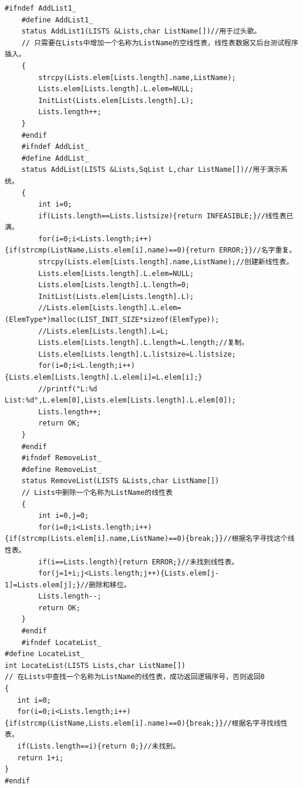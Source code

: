 \documentclass[supercite]{Experimental_Report}
\theoremstyle{definition}
\begin{document}
\begin{lstlisting}[title =多顺序表管理,frame=none]
	#ifndef AddList1_
	#define AddList1_
	status AddList1(LISTS &Lists,char ListName[])//用于过头歌。 
	// 只需要在Lists中增加一个名称为ListName的空线性表，线性表数据又后台测试程序插入。
	{
		strcpy(Lists.elem[Lists.length].name,ListName);
		Lists.elem[Lists.length].L.elem=NULL;
		InitList(Lists.elem[Lists.length].L);
		Lists.length++;
	}
	#endif
	#ifndef AddList_
	#define AddList_
	status AddList(LISTS &Lists,SqList L,char ListName[])//用于演示系统。 
	{
		int i=0;
		if(Lists.length==Lists.listsize){return INFEASIBLE;}//线性表已满。 
		for(i=0;i<Lists.length;i++){if(strcmp(ListName,Lists.elem[i].name)==0){return ERROR;}}//名字重复。 
		strcpy(Lists.elem[Lists.length].name,ListName);//创建新线性表。 
		Lists.elem[Lists.length].L.elem=NULL;
		Lists.elem[Lists.length].L.length=0;
		InitList(Lists.elem[Lists.length].L);
		//Lists.elem[Lists.length].L.elem=(ElemType*)malloc(LIST_INIT_SIZE*sizeof(ElemType));
		//Lists.elem[Lists.length].L=L;
		Lists.elem[Lists.length].L.length=L.length;//复制。 
		Lists.elem[Lists.length].L.listsize=L.listsize;
		for(i=0;i<L.length;i++){Lists.elem[Lists.length].L.elem[i]=L.elem[i];}
		//printf("L:%d  List:%d",L.elem[0],Lists.elem[Lists.length].L.elem[0]);
		Lists.length++;
		return OK;
	}
	#endif
	#ifndef RemoveList_
	#define RemoveList_
	status RemoveList(LISTS &Lists,char ListName[])
	// Lists中删除一个名称为ListName的线性表
	{
		int i=0,j=0;
		for(i=0;i<Lists.length;i++){if(strcmp(Lists.elem[i].name,ListName)==0){break;}}//根据名字寻找这个线性表。 
		if(i==Lists.length){return ERROR;}//未找到线性表。 
		for(j=1+i;j<Lists.length;j++){Lists.elem[j-1]=Lists.elem[j];}//删除和移位。 
		Lists.length--;
		return OK;
	}
	#endif
	#ifndef LocateList_
#define LocateList_
int LocateList(LISTS Lists,char ListName[])
// 在Lists中查找一个名称为ListName的线性表，成功返回逻辑序号，否则返回0
{
   int i=0;
   for(i=0;i<Lists.length;i++){if(strcmp(ListName,Lists.elem[i].name)==0){break;}}//根据名字寻找线性表。 
   if(Lists.length==i){return 0;}//未找到。 
   return 1+i;
}
#endif
\end{lstlisting}
\newpage
\end{document}
